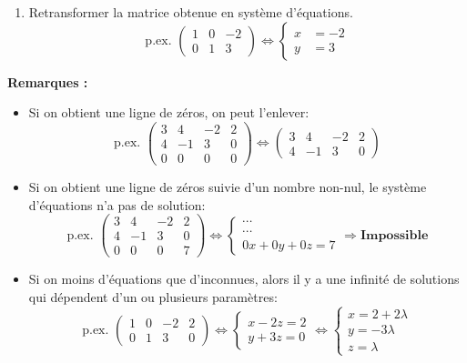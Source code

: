 \begin{enumerate}
\begin{enumerate}
	      \end{enumerate}
	\item Retransformer la matrice obtenue en système d'équations.
	      \[\text{p.ex. }  \left(\begin{array}{cc|c} 1 & 0 & -2 \\ 0 & 1 & 3  \end{array}\right) \Leftrightarrow \begin{cases} x &= -2 \\ y &= 3 \end{cases}  \]
\end{enumerate}

\textbf{Remarques :}
\begin{itemize}
	\item Si on obtient une ligne de zéros, on peut l'enlever:
	      \[\text{p.ex. }  \left(\begin{array}{ccc|c} 3 & 4 & -2 & 2 \\ 4 & -1 & 3 & 0 \\ 0 & 0 & 0 & 0 \end{array}\right) \Leftrightarrow  \left(\begin{array}{ccc|c} 3 & 4 & -2 & 2 \\ 4 & -1 & 3 & 0 \end{array}\right) \]
	\item Si on obtient une ligne de zéros suivie d'un nombre non-nul, le système d'équations n'a pas de solution:
	      \[\text{p.ex. }  \left(\begin{array}{ccc|c} 3 & 4 & -2 & 2 \\ 4 & -1 & 3 & 0 \\ 0 & 0 & 0 & 7 \end{array}\right) \Leftrightarrow  \begin{cases} \cdots \\ \cdots \\ 0x + 0y + 0z = 7 \end{cases} \Rightarrow \textbf{Impossible} \]
	\item Si on moins d'équations que d'inconnues, alors il y a une infinité de solutions qui dépendent d'un ou plusieurs paramètres:
	      \[\text{p.ex. }  \left(\begin{array}{ccc|c} 1 & 0 & -2 & 2 \\ 0 & 1 & 3 & 0 \end{array}\right) \Leftrightarrow  \begin{cases} x - 2z = 2 \\ y + 3z = 0 \end{cases} \Leftrightarrow  \begin{cases} x = 2 + 2\lambda \\ y = -3\lambda \\ z = \lambda \end{cases} \]
\end{itemize}

